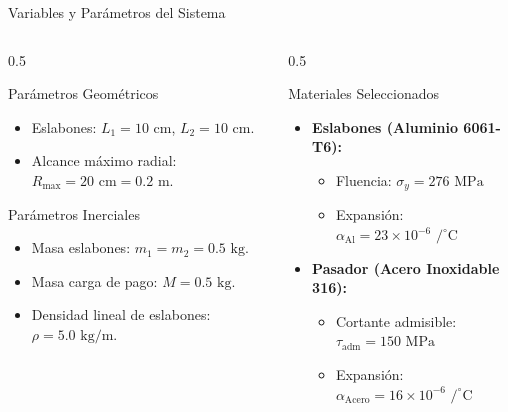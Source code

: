 \documentclass[aspectratio=169,11pt]{beamer}
\begin{document}
\begin{frame}{Variables y Parámetros del Sistema}
    \begin{columns}
        \begin{column}{0.5\textwidth}
            \begin{block}{Parámetros Geométricos}
                \begin{itemize}
                    \item Eslabones: $L_1 = 10\text{ cm}$, $L_2 = 10\text{ cm}$.
                    \item Alcance máximo radial: $R_{\text{max}} = 20\text{ cm} = 0.2\text{ m}$.
                \end{itemize}
            \end{block}
            \begin{block}{Parámetros Inerciales}
                \begin{itemize}
                    \item Masa eslabones: $m_1 = m_2 = 0.5\text{ kg}$.
                    \item Masa carga de pago: $M = 0.5\text{ kg}$.
                    \item Densidad lineal de eslabones: $\rho = 5.0\text{ kg/m}$.
                \end{itemize}
            \end{block}
        \end{column}
        \begin{column}{0.5\textwidth}
            \begin{block}{Materiales Seleccionados}
                \begin{itemize}
                    \item \textbf{Eslabones (Aluminio 6061-T6):}
                        \begin{itemize}
                            \item Fluencia: $\sigma_y = 276\text{ MPa}$
                            \item Expansión: $\alpha_{\text{Al}} = 23 \times 10^{-6}\text{ /}^\circ\text{C}$
                        \end{itemize}
                    \item \textbf{Pasador (Acero Inoxidable 316):}
                        \begin{itemize}
                            \item Cortante admisible: $\tau_{\text{adm}} = 150\text{ MPa}$
                            \item Expansión: $\alpha_{\text{Acero}} = 16 \times 10^{-6}\text{ /}^\circ\text{C}$
                        \end{itemize}
                \end{itemize}
            \end{block}
        \end{column}
    \end{columns}
\end{frame}
\end{document}
